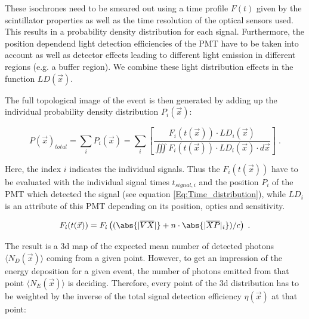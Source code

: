   These isochrones need to be smeared out using a time profile $F(t)$ given by the scintillator 
  properties as well as the time resolution of the optical sensors used. This results in a probability density distribution for each signal.
  Furthermore, the position dependend light detection efficiencies of the PMT have to be taken into account as well as detector effects leading to different 
  light emission in different regions (e.g. a buffer region). We combine these light distribution effects in the function $LD(\vec{x})$.
  
  
  The full topological image of the event is then generated by adding up the individual probability density distribution $P_i(\vec{x})$:
  
   \begin{equation}
     P(\vec{x})_{total} = \sum_{i} P_i(\vec{x}) = \sum_{i} \left[ \frac{F_i(t(\vec{x})) \cdot LD_i(\vec{x})}{\iiint F_i(t(\vec{x})) \cdot LD_i(\vec{x})  \cdot d\vec{x}} \right] \; .
     \label{eq:TotalP}
  \end{equation}
  
  Here, the index $i$ indicates the individual signals. Thus the $F_i(t(\vec{x}))$ have to be evaluated with the individual signal times $t_{signal, i}$ 
  and the position $P_i$ of the PMT which detected the signal (see equation \ref{Eq:Time_distribution}), while $LD_i$ is an attribute of this PMT depending on its position, 
  optics and sensitivity.   
  
  \begin{equation}
    \label{Eq:Time_distribution}
    F_i(t(\vec{x})) = F_i\left( (\abs{|\overline{VX}|} + n \cdot \abs{|\overline{XP}|_i})/c \right) \; .
  \end{equation}
  
  The result is a 3d map of the expected mean number of detected photons $\langle N_{D}(\vec{x}) \rangle$ coming from a given point. However, to get an impression of the energy
  deposition for a given event, the number of photons emitted from that point $\langle N_{E}(\vec{x}) \rangle$ is deciding.
  Therefore, every point of the 3d distribution has to be weighted by the inverse of the total signal detection efficiency $\eta(\vec{x})$ at that point:
  
